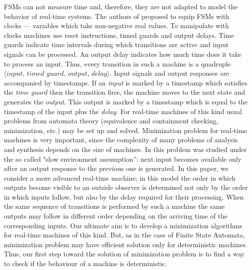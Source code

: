 \documentclass[conference]{IEEEtran}
\begin{document}
FSMs can not measure time and, therefore, they are not adapted to model the behavior of real-time systems. The authors of \cite{alur} proposed to equip  FSMs with clocks --- variables which take non-negative real values. To manipulate with clocks machines use reset instructions, timed guards and output delays. Time guards indicate time intervals during which transitions are active and input signals can be processed. An output delay indicates how much time does it take to process an input. Thus, every transition in such a machine is a quadruple $\langle\textit{input, timed guard, output, delay}\rangle$. Input signals and output responses are accompanied by timestamps. If an \emph{input} is marked by a timestamp which satisfies the \emph{time guard} then the transition fires, the machine moves to the next state and generates the \emph{output}. This output is marked by a timestamp which is equal to the timestamp of the input plus the \emph{delay}. For real-time machines of this kind usual problems from automata theory (equivalence and containment checking, minimization, etc.) may be set up and solved. Minimization problem for real-time machines is very important, since the complexity of many problems of analysis and synthesis depends on the size of machines. In \cite{tvar} this problem was studied under the so called "slow environment assumption'': next input becomes available only after an output response to the previous one is generated. In this paper, we consider a more advanced real-time machine; in this model the order in which outputs become visible to an outside observer is determined not only by the order in which inputs follow, but also by the delay required for their processing. When the same sequence of transitions is performed by such a machine the same outputs may follow in different order depending on the arriving time of the corresponding inputs. Our ultimate aim is to develop a minimization algorithms for real-time machines of this kind. But, as in the case of Finite State Automata, minimization problem may have efficient solution only for deterministic machines. Thus, our first step toward the solution of minimization problem is to find a way to check if the behaviour of a machine is deterministic.
\end{document}

